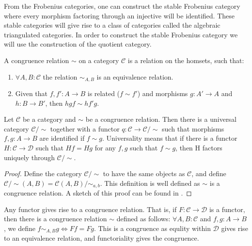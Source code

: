     From the Frobenius categories, one can construct the stable Frobenius category where every morphism factoring through an injective will be identified. These stable categories will give rise to a class of categories called the algebraic triangulated categories. In order to construct the stable Frobenius category we will use the construction of the quotient category.

    \begin{definition}
        A congruence relation $\sim$ on a category $\mathcal{C}$ is a relation on the homsets, such that:
        \begin{enumerate}
            \item $\forall A,B:\mathcal{C}$ the relation $\sim_{A,B}$ is an equivalence relation.
            \item Given that $f,f':A\rightarrow B$ is related ($f\sim f'$) and morphisms $g:A'\rightarrow A$ and $h:B\rightarrow B'$, then $hgf\sim hf'g$.
        \end{enumerate}
    \end{definition}

    \begin{prop}
        Let $\mathcal{C}$ be a category and $\sim$ be a congruence relation. Then there is a universal category $\mathcal{C}/\sim$ together with a functor $q:\mathcal{C}\rightarrow \mathcal{C}/\sim$ such that morphisms $f,g:A\rightarrow B$ are identified if $f\sim g$. Universality means that if there is a functor $H:\mathcal{C}\rightarrow \mathcal{D}$ such that $Hf=Hg$ for any $f,g$ such that $f\sim g$, then H factors uniquely through $\mathcal{C}/\sim$.
    \end{prop}

    \begin{proof}
        Define the category $\mathcal{C}/\sim$ to have the same objects as $\mathcal{C}$, and define $\mathcal{C}/\sim (A,B)=\mathcal{C}(A,B)/\sim_{a,b}$. This definition is well defined as $\sim$ is a congruence relation. A sketch of this proof can be found in \cite{Mac71}.
    \end{proof}

    \begin{remark}
        Any functor gives rise to a congruence relation. That is, if $F:\mathcal{C}\rightarrow \mathcal{D}$ is a functor, then there is a congruence relation $\sim$ defined as follows: $\forall A,B:\mathcal{C}$ and $f,g:A\rightarrow B$, we define $f\sim_{A,B}g \iff Ff=Fg$. This is a congruence as equlity within $\mathcal{D}$ gives rise to an equivalence relation, and functoriality gives the congruence.
    \end{remark}

